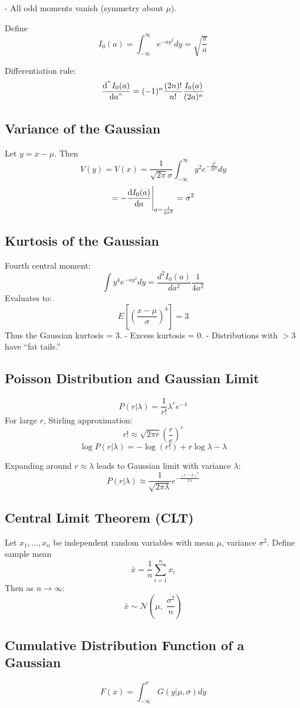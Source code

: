 - All odd moments vanish (symmetry about $\mu$).

Define
\[
      I_0(a) = \int_{-\infty}^{\infty} e^{-a y^2} dy = \sqrt{\frac{\pi}{a}}
\]

Differentiation rule:
\[
      \dv[^n]{I_0(a)}{a} = (-1)^n \frac{(2n)!}{n!} \frac{I_0(a)}{(2a)^n}
\]

\subsection{Variance of the Gaussian}
Let $y = x-\mu$. Then
\[
      V(y) = V(x) = \frac{1}{\sqrt{2 \pi}\sigma}
      \int_{-\infty}^{\infty} y^2 e^{-\frac{y^2}{2\sigma^2}} dy
\]
\[
      = -\dv{I_0(a)}{a}\Bigg|_{a=\frac{1}{2\sigma^2}} = \sigma^2
\]

\subsection{Kurtosis of the Gaussian}
Fourth central moment:
\[
      \int y^4 e^{-a y^2} dy = \frac{d^2 I_0(a)}{d a^2}\frac{1}{4 a^2}
\]
Evaluates to:
\[
      E\!\left[\left(\frac{x-\mu}{\sigma}\right)^4\right] = 3
\]
Thus the Gaussian kurtosis = 3.
- Excess kurtosis = 0.
- Distributions with $>3$ have “fat tails.”

\subsection{Poisson Distribution and Gaussian Limit}
\[
      P(r|\lambda) = \frac{1}{r!} \lambda^r e^{-\lambda}
\]
For large $r$, Stirling approximation:
\[
      r! \approx \sqrt{2 \pi r} \left(\frac{r}{e}\right)^r
\]
\[
      \log P(r|\lambda) = -\log(r!) + r\log\lambda - \lambda
\]

Expanding around $r \approx \lambda$ leads to Gaussian limit with variance $\lambda$:
\[
      P(r|\lambda) \approx
      \frac{1}{\sqrt{2 \pi \lambda}} e^{-\frac{(r-\lambda)^2}{2\lambda}}
\]

\subsection{Central Limit Theorem (CLT)}
Let $x_1,\dots,x_n$ be independent random variables with
mean $\mu$, variance $\sigma^2$. Define sample mean
\[
      \bar{x} = \frac{1}{n} \sum_{i=1}^n x_i
\]
Then as $n \to \infty$:
\[
      \bar{x} \sim \mathcal{N}\!\left(\mu,\; \frac{\sigma^2}{n}\right)
\]

\subsection{Cumulative Distribution Function of a Gaussian}
\[
      F(x) = \int_{-\infty}^x G(y|\mu,\sigma) dy
\]

